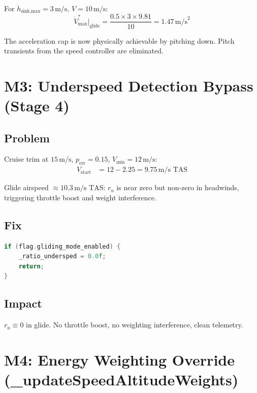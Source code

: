 \documentclass[12pt,a4paper]{article}
\begin{document}
For $\dot{h}_{\text{sink,max}} = 3\,\text{m/s}$, $V = 10\,\text{m/s}$:
\begin{equation}
  \dot{V}^*_{\max}\big|_{\text{glide}} = \frac{0.5 \times 3 \times 9.81}{10} = 1.47\,\text{m/s}^2
\end{equation}

The acceleration cap is now physically achievable by pitching down.
Pitch transients from the speed controller are eliminated.

\section{M3: Underspeed Detection Bypass (Stage 4)}

\subsection{Problem}

Cruise trim at $15\,\text{m/s}$, $p_{\text{err}} = 0.15$, $V_{\min} = 12\,\text{m/s}$:
\begin{align}
  V_{\text{start}} &= 12 - 2.25 = 9.75\,\text{m/s TAS}
\end{align}

Glide airspeed $\approx 10.3\,\text{m/s TAS}$: $r_u$ is near zero but
non-zero in headwinds, triggering throttle boost and weight interference.

\subsection{Fix}

\begin{lstlisting}[language=C++]
if (flag.gliding_mode_enabled) {
    _ratio_undersped = 0.0f;
    return;
}
\end{lstlisting}

\subsection{Impact}

$r_u \equiv 0$ in glide. No throttle boost, no weighting interference,
clean telemetry.

\section{M4: Energy Weighting Override (\_updateSpeedAltitudeWeights)}
\end{document}
